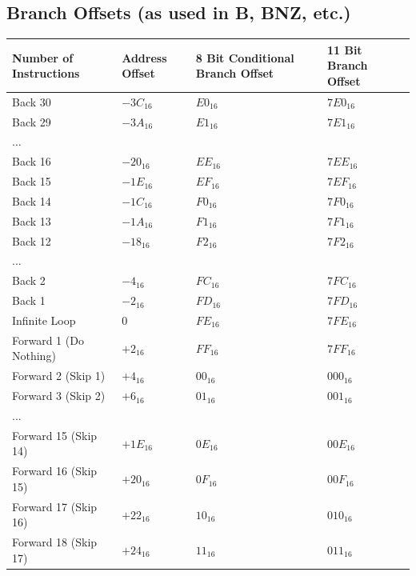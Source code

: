 \documentclass[12pt]{article}
\begin{document}
\subsection{Branch Offsets (as used in B, BNZ, etc.)}
\begin{tabular}{p{} p{} p{} p{}}
Number of Instructions & Address Offset & 8 Bit Conditional Branch Offset & 11 Bit Branch Offset\\
\hline
Back 30 & $-3C_{16}$ & $E0_{16}$ & $7E0_{16}$ \\
Back 29 & $-3A_{16}$ & $E1_{16}$ & $7E1_{16}$ \\
...\\
Back 16 & $-20_{16}$ & $EE_{16}$ & $7EE_{16}$ \\
Back 15 & $-1E_{16}$ & $EF_{16}$ & $7EF_{16}$ \\
Back 14 & $-1C_{16}$ & $F0_{16}$ & $7F0_{16}$ \\
Back 13 & $-1A_{16}$ & $F1_{16}$ & $7F1_{16}$ \\
Back 12 & $-18_{16}$ & $F2_{16}$ & $7F2_{16}$ \\
...\\
Back 2 & $-4_{16}$ & $FC_{16}$ & $7FC_{16}$ \\
Back 1 & $-2_{16}$ & $FD_{16}$ & $7FD_{16}$ \\
Infinite Loop & $0$ & $FE_{16}$ & $7FE_{16}$ \\
Forward 1 (Do Nothing) & $+2_{16}$ & $FF_{16}$ & $7FF_{16}$ \\
Forward 2 (Skip 1) & $+4_{16}$ & $00_{16}$ & $000_{16}$ \\
Forward 3 (Skip 2) & $+6_{16}$ & $01_{16}$ & $001_{16}$ \\
...\\
Forward 15 (Skip 14) & $+1E_{16}$ & $0E_{16}$ & $00E_{16}$ \\
Forward 16 (Skip 15) & $+20_{16}$ & $0F_{16}$ & $00F_{16}$ \\
Forward 17 (Skip 16) & $+22_{16}$ & $10_{16}$ & $010_{16}$ \\
Forward 18 (Skip 17) & $+24_{16}$ & $11_{16}$ & $011_{16}$
\end{tabular}


\newpage
{}





\printindex
\end{document}

